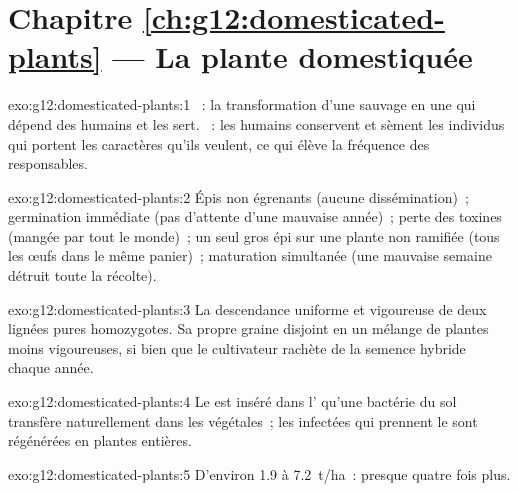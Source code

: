 \section*{Chapitre \ref{ch:g12:domesticated-plants} --- La plante domestiquée}

\begin{solution}{exo:g12:domesticated-plants:1}
~: la transformation d'une  sauvage en une 
qui dépend des humains et les sert. ~: les
humains conservent et sèment les individus qui portent les caractères
qu'ils veulent, ce qui élève la fréquence des  responsables.
\end{solution}

\begin{solution}{exo:g12:domesticated-plants:2}
Épis non égrenants (aucune dissémination)~; germination immédiate (pas
d'attente d'une mauvaise année)~; perte des toxines (mangée par tout
le monde)~; un seul gros épi sur une plante non ramifiée (tous les
œufs dans le même panier)~; maturation simultanée (une mauvaise
semaine détruit toute la récolte).
\end{solution}

\begin{solution}{exo:g12:domesticated-plants:3}
La descendance uniforme et vigoureuse de deux lignées pures
homozygotes. Sa propre graine disjoint en un mélange de plantes moins
vigoureuses, si bien que le cultivateur rachète de la semence hybride
chaque année.
\end{solution}

\begin{solution}{exo:g12:domesticated-plants:4}
Le  est inséré dans l' qu'une bactérie du sol transfère
naturellement dans les  végétales~; les  infectées qui
prennent le  sont régénérées en plantes entières.
\end{solution}

\begin{solution}{exo:g12:domesticated-plants:5}
D'environ \num{1.9} à \qty{7.2}{t/ha}~: presque quatre fois plus.
\end{solution}


